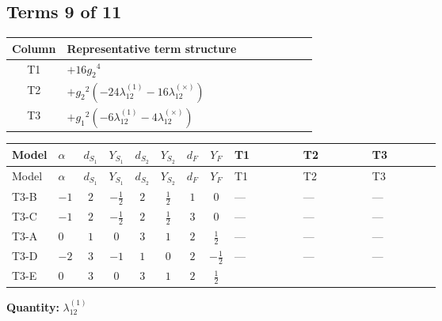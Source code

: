 \documentclass[8pt]{article}
\begin{document}
\begin{landscape}
\subsection*{Terms 9 of 11}
\begin{center}
\begin{tabular}{@{}c >{\raggedright\arraybackslash}p{0.82\linewidth}@{}}
\toprule
Column & Representative term structure \\
\midrule
T1 & \(\displaystyle +16 {g_2}^4\) \\
\midrule
T2 & \(\displaystyle +{g_2}^2 (-24 {\lambda_{12}^{(1)}}-16 {\lambda_{12}^{(\times)}})\) \\
\midrule
T3 & \(\displaystyle +{g_1}^2 (-6 {\lambda_{12}^{(1)}}-4 {\lambda_{12}^{(\times)}})\) \\
\midrule
\bottomrule
\end{tabular}
\end{center}
\smallskip
\tiny
\begin{longtable}{@{}llcccccc >{\raggedright\arraybackslash}p{0.21\linewidth} >{\raggedright\arraybackslash}p{0.21\linewidth} >{\raggedright\arraybackslash}p{0.21\linewidth}@{}}
\toprule
Model & $\alpha$ & $d_{S_1}$ & $Y_{S_1}$ & $d_{S_2}$ & $Y_{S_2}$ & $d_F$ & $Y_F$ & T1 & T2 & T3 \\
\midrule
\endfirsthead
\toprule
Model & $\alpha$ & $d_{S_1}$ & $Y_{S_1}$ & $d_{S_2}$ & $Y_{S_2}$ & $d_F$ & $Y_F$ & T1 & T2 & T3 \\
\midrule
\endhead
T3-B & $-1$ & $2$ & $-\frac{1}{2}$ & $2$ & $\frac{1}{2}$ & $1$ & $0$ & --- & --- & --- \\
\midrule
T3-C & $-1$ & $2$ & $-\frac{1}{2}$ & $2$ & $\frac{1}{2}$ & $3$ & $0$ & --- & --- & --- \\
\midrule
T3-A & $0$ & $1$ & $0$ & $3$ & $1$ & $2$ & $\frac{1}{2}$ & --- & --- & --- \\
\midrule
T3-D & $-2$ & $3$ & $-1$ & $1$ & $0$ & $2$ & $-\frac{1}{2}$ & --- & --- & --- \\
\midrule
T3-E & $0$ & $3$ & $0$ & $3$ & $1$ & $2$ & $\frac{1}{2}$ & \scriptsize\adjustbox{max width=\linewidth}{$\begin{gathered} +16 {g_2}^4\end{gathered}$} & \scriptsize\adjustbox{max width=\linewidth}{$\begin{gathered} +{g_2}^2 (-24 {\lambda_{12}^{(1)}}-16 {\lambda_{12}^{(\times)}})\end{gathered}$} & \scriptsize\adjustbox{max width=\linewidth}{$\begin{gathered} +{g_1}^2 (-6 {\lambda_{12}^{(1)}}-4 {\lambda_{12}^{(\times)}})\end{gathered}$} \\
\midrule
\bottomrule
\end{longtable}
\clearpage
\noindent\textbf{Quantity: }$\lambda_{12}^{(1)}$\par\smallskip

\end{landscape}
\end{document}
